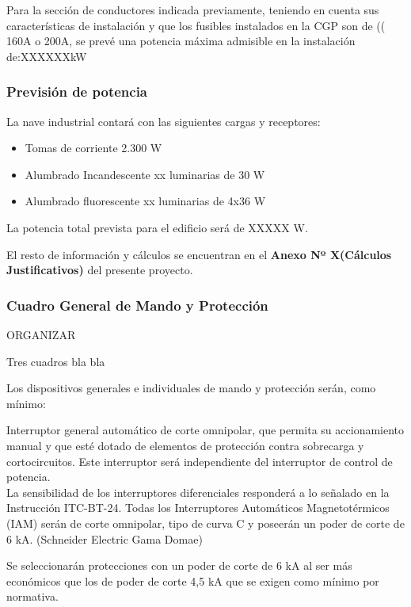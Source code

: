Para la sección de conductores indicada previamente, teniendo en cuenta sus características de instalación y que los fusibles instalados en la CGP son de (( 160A o 200A, se prevé una potencia máxima admisible en la instalación de:XXXXXXkW



\subsubsection{Previsión de potencia}

La nave industrial contará con las siguientes cargas y receptores:\\

\begin{itemize}
\item Tomas de corriente 2.300 W
\item Alumbrado Incandescente xx luminarias de 30 W 
\item Alumbrado fluorescente xx luminarias de 4x36 W 
\end{itemize}

La potencia total prevista para el edificio será de XXXXX W.

El resto de información y cálculos se encuentran en el {\bfseries Anexo Nº X(Cálculos Justificativos)} del presente proyecto.

\subsubsection{Cuadro General de Mando y Protección}

ORGANIZAR

Tres cuadros bla bla

Los dispositivos generales e individuales de mando y protección serán, como mínimo:

Interruptor general automático de corte omnipolar, que permita su accionamiento manual y que esté dotado de elementos de protección contra sobrecarga y cortocircuitos. Este interruptor será independiente del interruptor de control de potencia.\\



La sensibilidad de los interruptores diferenciales responderá a lo señalado en la Instrucción ITC-BT-24.
Todas los Interruptores Automáticos Magnetotérmicos (IAM) serán de corte omnipolar, tipo de curva C y poseerán un poder de corte de 6 kA. (Schneider Electric Gama Domae)

Se seleccionarán protecciones con un poder de corte de 6 kA al ser más económicos que los de poder de corte 4,5 kA que se exigen como mínimo por normativa.


